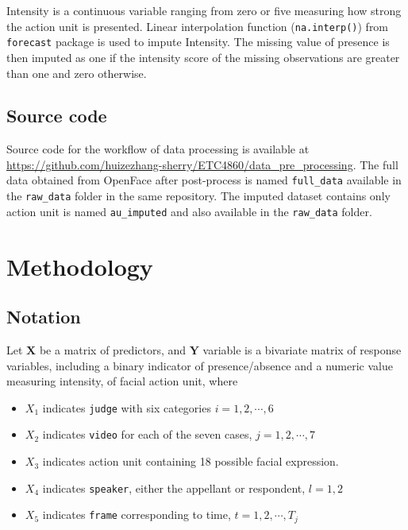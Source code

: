 \documentclass{monashthesis}
\begin{document}
Intensity is a continuous variable ranging from zero or five measuring how strong the action unit is presented. Linear interpolation function (\texttt{na.interp()}) from \texttt{forecast} package is used to impute Intensity. The missing value of presence is then imputed as one if the intensity score of the missing observations are greater than one and zero otherwise.

\hypertarget{source-code}{%
\section{Source code}\label{source-code}}

Source code for the workflow of data processing is available at \url{https://github.com/huizezhang-sherry/ETC4860/data_pre_processing}. The full data obtained from OpenFace after post-process is named \texttt{full\_data} available in the \texttt{raw\_data} folder in the same repository. The imputed dataset contains only action unit is named \texttt{au\_imputed} and also available in the \texttt{raw\_data} folder.

\let\cleardoublepage\clearpage

\hypertarget{Ch:method}{%
\chapter{Methodology}\label{Ch:method}}

\hypertarget{notation}{%
\section{Notation}\label{notation}}

Let \(\mathbf{X}\) be a matrix of predictors, and \(\mathbf{Y}\) variable is a bivariate matrix of response variables, including a binary indicator of presence/absence and a numeric value measuring intensity, of facial action unit, where

\begin{itemize}
\tightlist
\item
  \(X_1\) indicates \texttt{judge} with six categories \(i = 1,2, \cdots, 6\)
\item
  \(X_2\) indicates \texttt{video} for each of the seven cases, \(j = 1,2, \cdots, 7\)
\item
  \(X_3\) indicates action unit containing 18 possible facial expression.
\item
  \(X_4\) indicates \texttt{speaker}, either the appellant or respondent, \(l=1,2\)
\item
  \(X_5\) indicates \texttt{frame} corresponding to time, \(t = 1,2, \cdots, T_j\)
\end{itemize}
\end{document}
